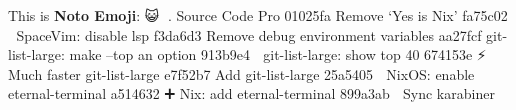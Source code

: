 \documentclass{article}
\begin{document}
  This is \textbf{Noto Emoji}: {😺} {👅}.
  { Source Code Pro}\newline
{
\newline
01025fa Remove `Yes is Nix'\newline%
fa75c02 {🔧} SpaceVim: disable lsp\newline%
f3da6d3 Remove debug environment variables\newline%
aa27fcf git-list-large: make --top an option\newline%
913b9e4 {🔧} git-list-large: show top 40\newline%
674153e {⚡️} Much faster git-list-large\newline%
e7f52b7 Add git-list-large\newline%
25a5405 {🔧} NixOS: enable eternal-terminal\newline%
a514632 {➕} Nix: add eternal-terminal\newline%
899a3ab {🔧} Sync karabiner\newline%
}
\end{document}
